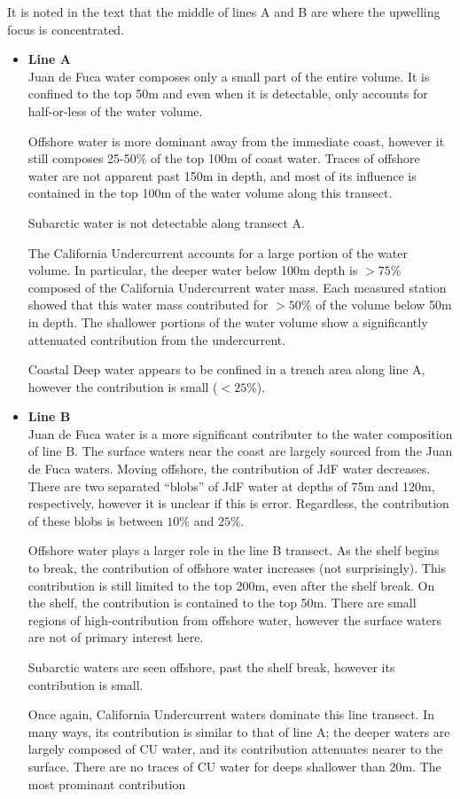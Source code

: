\documentclass[12pt]{extreport}
\begin{document}
It is noted in the text that the middle of lines A and B are where the upwelling focus is concentrated.

\begin{itemize}
\item \textbf{Line A} \\
Juan de Fuca water composes only a small part of the entire volume. It is confined to the top 50m and even when it is detectable, only accounts for half-or-less of the water volume.

Offshore water is more dominant away from the immediate coast, however it still composes 25-50$\%$ of the top 100m of coast water. Traces of offshore water are not apparent past 150m in depth, and most of its influence is contained in the top 100m of the water volume along this transect.

Subarctic water is not detectable along transect A.

The California Undercurrent accounts for a large portion of the water volume. In particular, the deeper water below 100m depth is $>75\%$ composed of the California Undercurrent water mass. Each measured station showed that this water mass contributed for $>50\%$ of the volume below 50m in depth. The shallower portions of the water volume show a significantly attenuated contribution from the undercurrent.

Coastal Deep water appears to be confined in a trench area along line A, however the contribution is small ($<25\%$).
\item \textbf{Line B} \\
Juan de Fuca water is a more significant contributer to the water composition of line B. The surface waters near the coast are largely sourced from the Juan de Fuca waters. Moving offshore, the contribution of JdF water decreases. There are two separated ``blobs'' of JdF water at depths of 75m and 120m, respectively, however it is unclear if this is error. Regardless, the contribution of these blobs is between $10\%$ and $25\%$.

Offshore water plays a larger role in the line B transect. As the shelf begins to break, the contribution of offshore water increases (not surprisingly). This contribution is still limited to the top 200m, even after the shelf break. On the shelf, the contribution is contained to the top 50m. There are small regions of high-contribution from offshore water, however the surface waters are not of primary interest here.

Subarctic waters are seen offshore, past the shelf break, however its contribution is small.

Once again, California Undercurrent waters dominate this line transect. In many ways, its contribution is similar to that of line A; the deeper waters are largely composed of CU water, and its contribution attenuates nearer to the surface. There are no traces of CU water for deeps shallower than 20m. The most prominant contribution 
\end{itemize}
\end{document}
